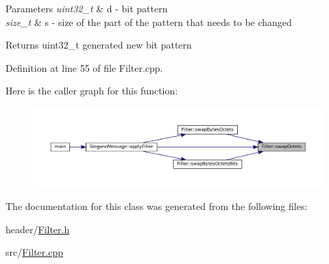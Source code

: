 \begin{DoxyParams}{Parameters}
{\em uint32\+\_\+t} & d -\/ bit pattern \\
\hline
{\em size\+\_\+t} & s -\/ size of the part of the pattern that needs to be changed \\
\hline
\end{DoxyParams}
\begin{DoxyReturn}{Returns}
uint32\+\_\+t generated new bit pattern 
\end{DoxyReturn}


Definition at line 55 of file Filter.\+cpp.

Here is the caller graph for this function\+:\nopagebreak
\begin{figure}[H]
\begin{center}
\leavevmode
\includegraphics[width=350pt]{classFilter_aeb85c27a3d80540f2bd4b5f314543d4c_icgraph}
\end{center}
\end{figure}


The documentation for this class was generated from the following files\+:\begin{DoxyCompactItemize}
\item 
header/\mbox{\hyperlink{Filter_8h}{Filter.\+h}}\item 
src/\mbox{\hyperlink{Filter_8cpp}{Filter.\+cpp}}\end{DoxyCompactItemize}
